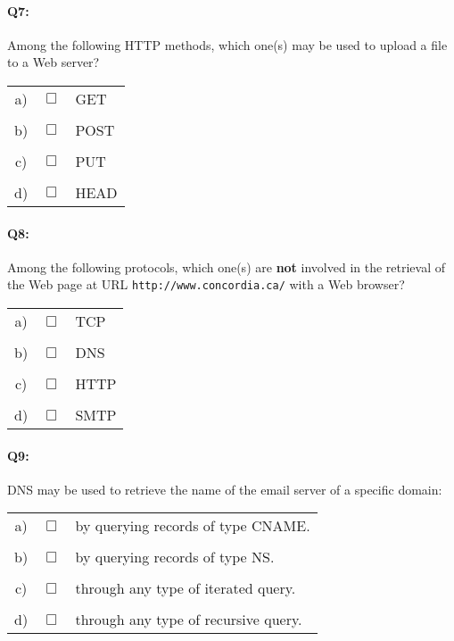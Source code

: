 \documentclass{llncs}
\begin{document}
\paragraph{\textbf{Q7:}} Among the following HTTP methods, which one(s) may be used to upload a file to a
Web server?\\

\begin{tabular}{ccl}
  a) & $\Box$ & GET\\
  \\
  b) & $\Box$ & POST\\
  \\
  c) & $\Box$ & PUT\\
  \\
  d) & $\Box$ & HEAD\\
\end{tabular}

\paragraph{\textbf{Q8:}} Among the following protocols, which one(s) are \textbf{not} involved in the retrieval of the Web page at URL \texttt{http://www.concordia.ca/} with a Web browser?\\

\begin{tabular}{ccl}
  a) & $\Box$ & TCP\\
  \\
  b) & $\Box$ & DNS\\
  \\
  c) & $\Box$ & HTTP\\
  \\
  d) & $\Box$ & SMTP\\
\end{tabular}

\paragraph{\textbf{Q9:}} DNS may be used to retrieve the name of the email server of a specific domain:\\

\begin{tabular}{ccl}
  a) & $\Box$ & by querying records of type CNAME.\\
  \\
  b) & $\Box$ & by querying records of type NS.\\
  \\
  c) & $\Box$ & through any type of iterated query.\\
  \\
  d) & $\Box$ & through any type of recursive query.\\
\end{tabular}
\end{document}
